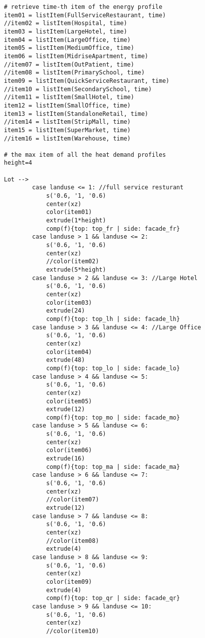 \begin{multicols}{2}
\begin{verbatim}
# retrieve time-th item of the energy profile
item01 = listItem(FullServiceRestaurant, time)
//item02 = listItem(Hospital, time)
item03 = listItem(LargeHotel, time)
item04 = listItem(LargeOffice, time)
item05 = listItem(MediumOffice, time)
item06 = listItem(MidriseApartment, time)
//item07 = listItem(OutPatient, time)
//item08 = listItem(PrimarySchool, time)
item09 = listItem(QuickServiceRestaurant, time)
//item10 = listItem(SecondarySchool, time)
//item11 = listItem(SmallHotel, time)
item12 = listItem(SmallOffice, time)
item13 = listItem(StandaloneRetail, time)
//item14 = listItem(StripMall, time)
item15 = listItem(SuperMarket, time)
//item16 = listItem(Warehouse, time)

# the max item of all the heat demand profiles
height=4

Lot -->
        case landuse <= 1: //full service resturant
            s('0.6, '1, '0.6)
            center(xz)
            color(item01)
            extrude(1*height)
            comp(f){top: top_fr | side: facade_fr}
        case landuse > 1 && landuse <= 2:
            s('0.6, '1, '0.6)
            center(xz)
            //color(item02)
            extrude(5*height)
        case landuse > 2 && landuse <= 3: //Large Hotel
            s('0.6, '1, '0.6)
            center(xz)
            color(item03)
            extrude(24)
            comp(f){top: top_lh | side: facade_lh}
        case landuse > 3 && landuse <= 4: //Large Office
            s('0.6, '1, '0.6)
            center(xz)
            color(item04)
            extrude(48)
            comp(f){top: top_lo | side: facade_lo}
        case landuse > 4 && landuse <= 5:
            s('0.6, '1, '0.6)
            center(xz)
            color(item05)
            extrude(12)
            comp(f){top: top_mo | side: facade_mo}
        case landuse > 5 && landuse <= 6:
            s('0.6, '1, '0.6)
            center(xz)
            color(item06)
            extrude(16)
            comp(f){top: top_ma | side: facade_ma}
        case landuse > 6 && landuse <= 7:
            s('0.6, '1, '0.6)
            center(xz)
            //color(item07)
            extrude(12)
        case landuse > 7 && landuse <= 8:
            s('0.6, '1, '0.6)
            center(xz)
            //color(item08)
            extrude(4)
        case landuse > 8 && landuse <= 9:
            s('0.6, '1, '0.6)
            center(xz)
            color(item09)
            extrude(4)
            comp(f){top: top_qr | side: facade_qr}
        case landuse > 9 && landuse <= 10:
            s('0.6, '1, '0.6)
            center(xz)
            //color(item10)

\end{verbatim}
\end{multicols}
